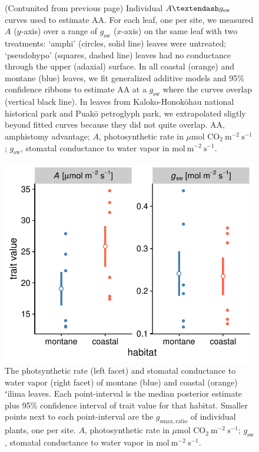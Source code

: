 \documentclass[
  letterpaper,
  DIV=11,
  numbers=noendperiod]{scrartcl}
\begin{document}
\setcounter{figure}{\numexpr\value{figure}-1\relax}

\begin{figure}
  \caption{(Contunited from previous page) Individual $A \textendash g_\mathrm{sw}$ curves used to estimate $\mathrm{AA}$. For each leaf, one per site, we measured $A$ ($y$-axis) over a range of $g_\mathrm{sw}$ ($x$-axis) on the same leaf with two treatments: `amphi' (circles, solid line) leaves were untreated; `pseudohypo' (squares, dashed line) leaves had no conductance through the upper (adaxial) surface. In all coastal (orange) and montane (blue) leaves, we fit generalized additive models and 95\% confidence ribbons to estimate $\mathrm{AA}$ at a $g_\mathrm{sw}$ where the curves overlap (vertical black line). In leaves from Kaloko-Honokōhau national historical park and Puakō petroglyph park, we extrapolated sligtly beyond fitted curves because they did not quite overlap. $\mathrm{AA}$, amphistomy advantage; $A$, photosynthetic rate in $\mu \text{mol CO}_2~\text{m}^{-2}~\text{s}^{-1}$; $g_\mathrm{sw}$, stomatal conductance to water vapor in $\text{mol}~\text{m}^{-2}~\text{s}^{-1}$.}
  \label{fig:licor}
\end{figure}

\newpage

\begin{figure}
  \includegraphics{../figures/habitat-Ags.pdf}
  \caption{The photsynthetic rate (left facet) and stomatal conductance to water vapor (right facet) of montane (blue) and coastal (orange) ʻilima leaves. Each point-interval is the median posterior estimate plus 95\% confidence interval of trait value for that habitat. Smaller points next to each point-interval are the $g_\mathrm{smax,ratio}$ of individual plants, one per site. $A$, photosynthetic rate in $\mu \text{mol CO}_2~\text{m}^{-2}~\text{s}^{-1}$; $g_\mathrm{sw}$, stomatal conductance to water vapor in $\text{mol}~\text{m}^{-2}~\text{s}^{-1}$.}
  \label{fig:habitat-Ags}
\end{figure}
\end{document}
